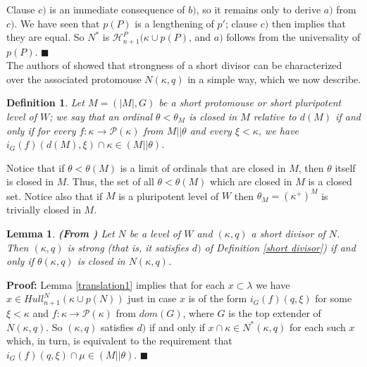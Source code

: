 \documentclass[12pt]{article}
\newtheorem{lem}[thm]{Lemma}
\newtheorem{defn}[thm]{Definition}
\begin{document}
Clause $c)$ is an immediate consequence of $b)$, so it remains only to derive $a)$ from $c)$.  We have seen that $p (P)$ is a lengthening of $p'$; clause $c)$ then implies that they are equal.  So $N^*$ is $\mathcal{H}_{n+1}^{P} (\kappa \cup p(P)$, and $a)$ follows from the universality of $p(P)$. $\blacksquare$\\


The authors of \cite{zeman square proof} showed that strongness of a short divisor can be characterized over the associated protomouse $N(\kappa , q)$ in a simple way, which we now describe.\\

\begin{defn} \label{theta is closed in M}
Let $M = ( |M| , G )$ be a short protomouse or short pluripotent level of $W$; we say that an ordinal $\theta < \theta_M$ is closed in $M$ relative to $d(M)$ if and only if for every $f: \kappa \longrightarrow \mathcal{P}(\kappa)$ from $M || \theta$ and every $\xi < \kappa$, we have $i_G (f) (d(M) , \xi ) \cap \kappa \in (M || \theta )$.
\end{defn}

Notice that if $\theta < \theta (M)$ is a limit of ordinals that are closed in $M$, then $\theta$ itself is closed in $M$.  Thus, the set of all $\theta < \theta (M)$ which are closed in $M$ is a closed set.  Notice also that if $M$ is a pluripotent level of $W$ then $\theta_M = (\kappa^+)^M$ is trivially closed in $M$.\\

\begin{lem} \label{strongness is the same as theta closed}
\textbf{(From \cite{zeman square proof})}
Let $N$ be a level of $W$ and $(\kappa , q)$ a short divisor of $N$.  Then $(\kappa , q)$ is strong (that is, it satisfies $d)$ of Definition \ref{short divisor}) if and only if $\theta (\kappa , q)$ is closed in $N (\kappa , q)$.
\end{lem}

\textbf{Proof:} Lemma \ref{translation1} implies that for each $x \subset \lambda$ we have $x \in Hull_{n+1}^N (\kappa \cup p(N))$ just in case $x$ is of the form $i_G (f)(q , \xi )$ for some $\xi < \kappa$ and $f: \kappa \longrightarrow \mathcal{P}(\kappa )$ from $dom (G)$, where $G$ is the top extender of $N (\kappa , q)$.  So $(\kappa , q)$ satisfies $d)$ if and only if $x \cap \kappa \in N^* ( \kappa , q)$ for each such $x$ which, in turn, is equivalent to the requirement that $i_G (f)(q , \xi) \cap \mu \in (M || \theta)$. $\blacksquare$\\
\end{document}
